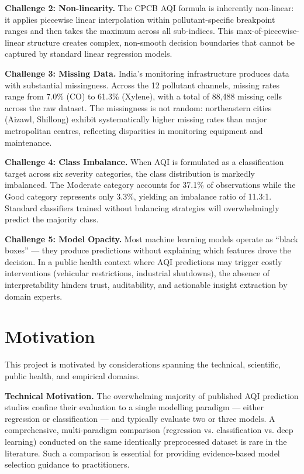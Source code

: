 \documentclass[12pt,a4paper]{report}
\begin{document}
\textbf{Challenge 2: Non-linearity.} The CPCB AQI formula is inherently non-linear: it applies piecewise linear interpolation within pollutant-specific breakpoint ranges and then takes the maximum across all sub-indices. This max-of-piecewise-linear structure creates complex, non-smooth decision boundaries that cannot be captured by standard linear regression models.

\textbf{Challenge 3: Missing Data.} India's monitoring infrastructure produces data with substantial missingness. Across the 12 pollutant channels, missing rates range from 7.0\% (CO) to 61.3\% (Xylene), with a total of 88,488 missing cells across the raw dataset. The missingness is not random: northeastern cities (Aizawl, Shillong) exhibit systematically higher missing rates than major metropolitan centres, reflecting disparities in monitoring equipment and maintenance.

\textbf{Challenge 4: Class Imbalance.} When AQI is formulated as a classification target across six severity categories, the class distribution is markedly imbalanced. The Moderate category accounts for 37.1\% of observations while the Good category represents only 3.3\%, yielding an imbalance ratio of 11.3:1. Standard classifiers trained without balancing strategies will overwhelmingly predict the majority class.

\textbf{Challenge 5: Model Opacity.} Most machine learning models operate as ``black boxes'' --- they produce predictions without explaining which features drove the decision. In a public health context where AQI predictions may trigger costly interventions (vehicular restrictions, industrial shutdowns), the absence of interpretability hinders trust, auditability, and actionable insight extraction by domain experts.

\section{Motivation}

This project is motivated by considerations spanning the technical, scientific, public health, and empirical domains.

\textbf{Technical Motivation.} The overwhelming majority of published AQI prediction studies confine their evaluation to a single modelling paradigm --- either regression or classification --- and typically evaluate two or three models. A comprehensive, multi-paradigm comparison (regression vs. classification vs. deep learning) conducted on the same identically preprocessed dataset is rare in the literature. Such a comparison is essential for providing evidence-based model selection guidance to practitioners.
\end{document}
